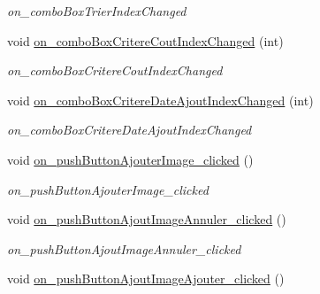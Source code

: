 \begin{DoxyCompactItemize}
\begin{DoxyCompactList}\small\item\em on\+\_\+combo\+Box\+Trier\+Index\+Changed \end{DoxyCompactList}\item 
\mbox{\label{classMainWindow_a4ce966ee5dac14ecc0d7faf13fbe974d}} 
void \hyperlink{classMainWindow_a4ce966ee5dac14ecc0d7faf13fbe974d}{on\+\_\+combo\+Box\+Critere\+Cout\+Index\+Changed} (int)
\begin{DoxyCompactList}\small\item\em on\+\_\+combo\+Box\+Critere\+Cout\+Index\+Changed \end{DoxyCompactList}\item 
\mbox{\label{classMainWindow_afd34abf465e165a2d8e3aa3b65451ee9}} 
void \hyperlink{classMainWindow_afd34abf465e165a2d8e3aa3b65451ee9}{on\+\_\+combo\+Box\+Critere\+Date\+Ajout\+Index\+Changed} (int)
\begin{DoxyCompactList}\small\item\em on\+\_\+combo\+Box\+Critere\+Date\+Ajout\+Index\+Changed \end{DoxyCompactList}\item 
\mbox{\label{classMainWindow_a16d6f34d51ccffec28fc667cce4c4800}} 
void \hyperlink{classMainWindow_a16d6f34d51ccffec28fc667cce4c4800}{on\+\_\+push\+Button\+Ajouter\+Image\+\_\+clicked} ()
\begin{DoxyCompactList}\small\item\em on\+\_\+push\+Button\+Ajouter\+Image\+\_\+clicked \end{DoxyCompactList}\item 
\mbox{\label{classMainWindow_af8e692c3bce912dbdaf87e66db8ed9bc}} 
void \hyperlink{classMainWindow_af8e692c3bce912dbdaf87e66db8ed9bc}{on\+\_\+push\+Button\+Ajout\+Image\+Annuler\+\_\+clicked} ()
\begin{DoxyCompactList}\small\item\em on\+\_\+push\+Button\+Ajout\+Image\+Annuler\+\_\+clicked \end{DoxyCompactList}\item 
\mbox{\label{classMainWindow_a99a0007db57453254e82797b4eb4bf1a}} 
void \hyperlink{classMainWindow_a99a0007db57453254e82797b4eb4bf1a}{on\+\_\+push\+Button\+Ajout\+Image\+Ajouter\+\_\+clicked} ()

\end{DoxyCompactItemize}
